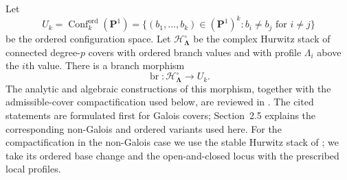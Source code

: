 \documentclass[10pt,a4paper]{amsart}
\numberwithin{equation}{section}
\begin{document}
Let
\[
 U_k=\operatorname{Conf}^{\mathrm{ord}}_k(\mathbf P^1)
 =\{(b_1,\ldots,b_k)\in(\mathbf P^1)^k:b_i\neq b_j\text{ for }i\neq j\}
\]
be the ordered configuration space.  Let
$\mathcal H^\circ_{\boldsymbol\Lambda}$ be the complex Hurwitz stack of
connected degree-$p$ covers with ordered branch values and with profile
$\Lambda_i$ above the $i$th value.  There is a branch morphism
\[
 \operatorname{br}:\mathcal H^\circ_{\boldsymbol\Lambda}\longrightarrow U_k.
\]
The analytic and algebraic constructions of this morphism, together with
the admissible-cover compactification used below, are reviewed in
\cite[Section~2.5, Proposition~3.2, Theorem~4.11,
Remark~4.15(i), and Section~5]{RomagnyWewers}.  The cited statements are
formulated first for Galois covers; Section~2.5 explains the corresponding
non-Galois and ordered variants used here.
For the compactification in the non-Galois case we use the stable Hurwitz
stack of \cite[Sections~6.3 and~6.6, especially Theorem~6.3.1 and
Proposition~6.6.12]{BertinRomagny}; we take its ordered base change and the
open-and-closed locus with the prescribed local profiles.
\end{document}
